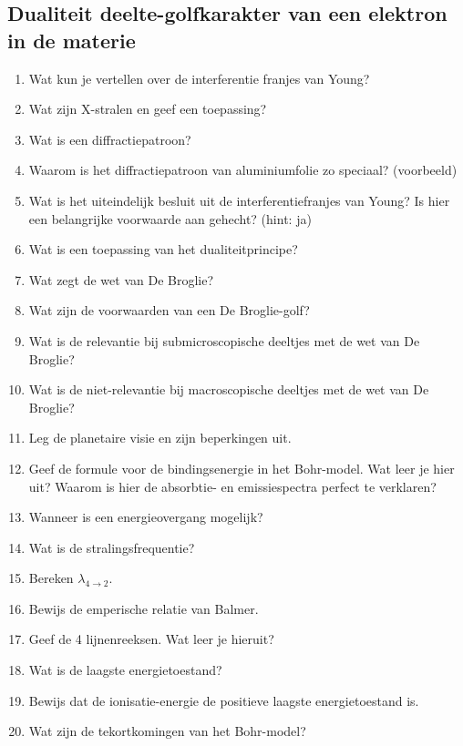 \documentclass[a4paper,12pt]{article}
\begin{document}
    \subsection*{Dualiteit deelte-golfkarakter van een elektron in de materie}
    \begin{enumerate}
        \item Wat kun je vertellen over de interferentie franjes van Young?
        \item Wat zijn X-stralen en geef een toepassing?
        \item Wat is een diffractiepatroon?
        \item Waarom is het diffractiepatroon van aluminiumfolie zo speciaal? (voorbeeld)
        \item Wat is het uiteindelijk besluit uit de interferentiefranjes van Young? Is hier een belangrijke voorwaarde aan gehecht? (hint: ja)
        \item Wat is een toepassing van het dualiteitprincipe?
        \item Wat zegt de wet van De Broglie?
        \item Wat zijn de voorwaarden van een De Broglie-golf?
        \item Wat is de relevantie bij submicroscopische deeltjes met de wet van De Broglie?
        \item Wat is de niet-relevantie bij macroscopische deeltjes met de wet van De Broglie?
        \item Leg de planetaire visie en zijn beperkingen uit.
        \item Geef de formule voor de bindingsenergie in het Bohr-model. Wat leer je hier uit? Waarom is hier de absorbtie- en emissiespectra perfect te verklaren?
        \item Wanneer is een energieovergang mogelijk?
        \item Wat is de stralingsfrequentie?
        \item Bereken $\lambda_{4 \rightarrow 2}$. 
        \item Bewijs de emperische relatie van Balmer.
        \item Geef de 4 lijnenreeksen. Wat leer je hieruit?
        \item Wat is de laagste energietoestand?
        \item Bewijs dat de ionisatie-energie de positieve laagste energietoestand is.
        \item Wat zijn de tekortkomingen van het Bohr-model?
    \end{enumerate}
\end{document}
